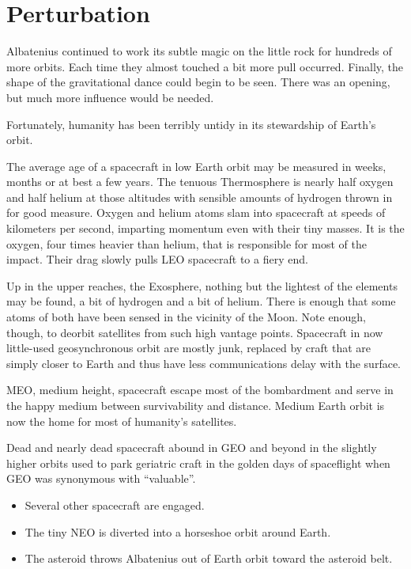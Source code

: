 %
%

\chapter{Perturbation}

Albatenius continued to work its subtle magic on the little rock for hundreds of more orbits. Each time they almost touched a bit more pull occurred. Finally, the shape of the gravitational dance could begin to be seen. There was an opening, but much more influence would be needed.

Fortunately, humanity has been terribly untidy in its stewardship of Earth's orbit.

The average age of a spacecraft in low Earth orbit may be measured in weeks, months or at best a few years. The tenuous Thermosphere is nearly half oxygen and half helium at those altitudes with sensible amounts of hydrogen thrown in for good measure. Oxygen and helium atoms slam into spacecraft at speeds of kilometers per second, imparting momentum even with their tiny masses. It is the oxygen, four times heavier than helium, that is responsible for most of the impact. Their drag slowly pulls LEO spacecraft to a fiery end.

Up in the upper reaches, the Exosphere, nothing but the lightest of the elements may be found, a bit of hydrogen and a bit of helium. There is enough that some atoms of both have been sensed in the vicinity of the Moon. Note enough, though, to deorbit satellites from such high vantage points. Spacecraft in now little-used geosynchronous orbit are mostly junk, replaced by craft that are simply closer to Earth and thus have less communications delay with the surface.

MEO, medium height, spacecraft escape most of the bombardment and serve in the happy medium between survivability and distance. Medium Earth orbit is now the home for most of humanity's satellites.

Dead and nearly dead spacecraft abound in GEO and beyond in the slightly higher orbits used to park geriatric craft in the golden days of spaceflight when GEO was synonymous with ``valuable''.

\begin{itemize}
\item{Several other spacecraft are engaged.}
\item{The tiny NEO is diverted into a horseshoe orbit around Earth.}
\item{The asteroid throws Albatenius out of Earth orbit toward the asteroid belt.}
\end{itemize}

\newpage
\thispagestyle{empty}